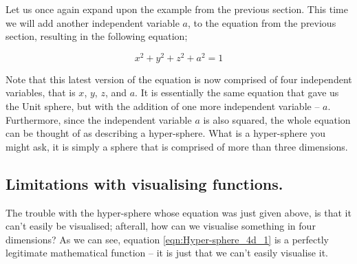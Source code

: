 \documentclass{article}
\begin{document}
Let us once again expand upon the example from the previous section. This time we will add another independent
variable $a$, to the equation from the previous section, resulting in the following equation;

\begin{equation}
\label{eqn:Hyper-sphere_4d_1}
x^{2} + y^{2} + z^{2} + a^{2} = 1
\end{equation}

Note that this latest version of the equation is now comprised of four independent variables, that is $x$, $y$, $z$, 
and $a$. It is essentially the same equation that gave us the Unit sphere, but with the addition of one more
independent variable -- $a$. Furthermore, since the independent variable $a$ is also squared, the whole equation
can be thought of as describing a hyper-sphere. What is a hyper-sphere you might ask, it is simply a sphere that
is comprised of more than three dimensions.\\


\subsection{Limitations with visualising functions.}

The trouble with the hyper-sphere whose equation was just given above, is that it can't easily be visualised; afterall,
how can we visualise something in four dimensions? As we can see, equation \ref{eqn:Hyper-sphere_4d_1} is a
perfectly legitimate mathematical function -- it is just that we can't easily visualise it.
\end{document}
